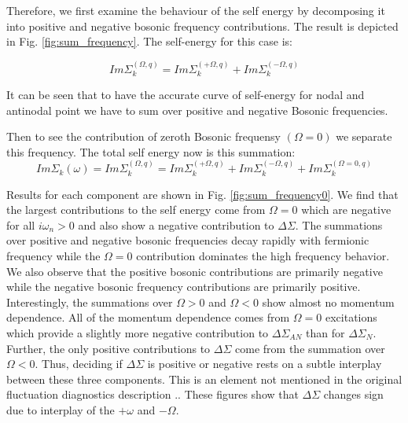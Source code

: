 Therefore, we first examine the behaviour of the self energy by decomposing it into positive and negative bosonic frequency contributions. The result is depicted in Fig. \ref{fig:sum_frequency}. The self-energy for this case is:

\begin{equation}
    Im\Sigma_k^{(\Omega,q)}= Im\Sigma_k^{(+ \Omega,q)}+Im\Sigma_k^{(- \Omega,q)}
\end{equation}

It can be seen that to have the accurate curve of self-energy for nodal and antinodal point we have to sum over positive and negative Bosonic frequencies. 


\noindent Then to see the contribution of zeroth Bosonic frequensy $(\Omega=0)$ we separate this frequency. The total self energy now is this summation:
\begin{equation}
    Im\Sigma_k(\omega)=Im\Sigma_k^{(\Omega,q)}= Im\Sigma_k^{(+ \Omega,q)}+Im\Sigma_k^{(- \Omega,q)} + Im\Sigma_k^{(\Omega=0,q)}
\end{equation}

 Results for each component are shown in Fig. \ref{fig:sum_frequency0}. We find that the largest contributions to the self energy come from $\Omega=0$ which are negative for all $i\omega_n>0$ and also show a negative contribution to $\Delta \Sigma$. The summations over positive and negative bosonic frequencies decay rapidly with fermionic frequency while the $\Omega=0$ contribution dominates the high frequency behavior.  We also observe that the positive bosonic contributions are primarily negative while the negative bosonic frequency contributions are primarily positive.  Interestingly, the summations over $\Omega>0$ and $\Omega<0$ show almost no momentum dependence.  All of the momentum dependence comes from $\Omega=0$ excitations which provide a slightly more negative contribution to $\Delta \Sigma_{AN}$ than for $\Delta \Sigma_N$. Further, the only positive contributions to $\Delta \Sigma$ come from the summation over $\Omega<0$.  Thus, deciding if $\Delta \Sigma$ is positive or negative rests on a subtle interplay between these three components. This is an element not mentioned in the original fluctuation diagnostics description  .\cite{Toschi}. These figures show that $\Delta \Sigma$ changes sign due to interplay of the $+\omega$ and $-\Omega$. 

